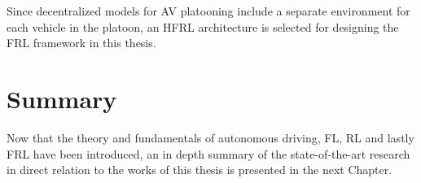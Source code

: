 Since decentralized models for AV platooning include a separate environment for each
vehicle in the platoon, an HFRL architecture is selected for designing the FRL framework in this thesis.

\section{Summary}
Now that the theory and fundamentals of autonomous driving, FL, RL and lastly FRL
have been introduced, an in depth summary of the state-of-the-art research in
direct relation to the works of this thesis is presented in the next Chapter.